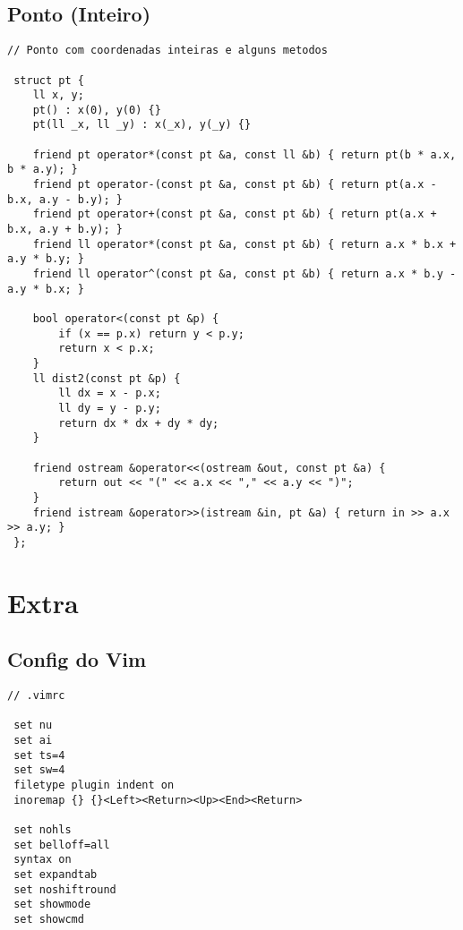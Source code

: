 \documentclass[11pt, a4paper, twoside]{article}
\begin{document}
\subsection{Ponto (Inteiro)}
\begin{lstlisting}
// Ponto com coordenadas inteiras e alguns metodos

 struct pt {
 	ll x, y;
 	pt() : x(0), y(0) {}
 	pt(ll _x, ll _y) : x(_x), y(_y) {}
 
 	friend pt operator*(const pt &a, const ll &b) { return pt(b * a.x, b * a.y); }
 	friend pt operator-(const pt &a, const pt &b) { return pt(a.x - b.x, a.y - b.y); }
 	friend pt operator+(const pt &a, const pt &b) { return pt(a.x + b.x, a.y + b.y); }
 	friend ll operator*(const pt &a, const pt &b) { return a.x * b.x + a.y * b.y; }
 	friend ll operator^(const pt &a, const pt &b) { return a.x * b.y - a.y * b.x; }
 
 	bool operator<(const pt &p) {
 		if (x == p.x) return y < p.y;
 		return x < p.x;
 	}
 	ll dist2(const pt &p) {
 		ll dx = x - p.x;
 		ll dy = y - p.y;
 		return dx * dx + dy * dy;
 	}
 
 	friend ostream &operator<<(ostream &out, const pt &a) {
 		return out << "(" << a.x << "," << a.y << ")";
 	}
 	friend istream &operator>>(istream &in, pt &a) { return in >> a.x >> a.y; }
 };
\end{lstlisting}

\pagebreak


%
%

\section{Extra}

\subsection{Config do Vim}
\begin{lstlisting}
// .vimrc

 set nu
 set ai
 set ts=4
 set sw=4
 filetype plugin indent on
 inoremap {} {}<Left><Return><Up><End><Return> 
 
 set nohls
 set belloff=all
 syntax on
 set expandtab
 set noshiftround
 set showmode
 set showcmd
\end{lstlisting}
\end{document}
